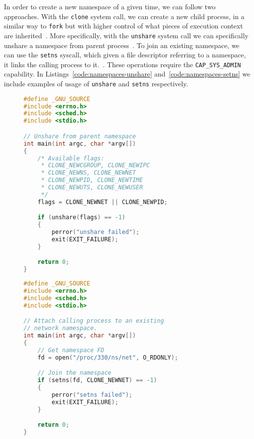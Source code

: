 In order to create a new namespace of a given time, we can follow two approaches.
With the \texttt{clone} system call, we can create a new child process, in a similar way to \texttt{fork} but with higher control of what pieces of execution context are inherited~\cite{clone-manual}.
More specifically, with the \texttt{unshare} system call we can specifically unshare a namespace from parent process~\cite{unshare-manual}.
To join an existing namespace, we can use the \texttt{setns} syscall, which given a file descriptor referring to a namespace, it links the calling process to it.~\cite{setns-manual}.
These operations require the \texttt{CAP\_SYS\_ADMIN} capability.
In Listings~\ref{code:namespaces-unshare} and~\ref{code:namespaces-setns} we include examples of usage of \texttt{unshare} and \texttt{setns} respectively.
\begin{figure}[h!]
    \begin{minipage}{.45\textwidth}
        \begin{lstlisting}[language=C,caption={Snippet to unshare the calling thread from a namespace using the \texttt{unshare} system call.\label{code:namespaces-unshare}}]
#define _GNU_SOURCE
#include <errno.h>
#include <sched.h>
#include <stdio.h>

// Unshare from parent namespace
int main(int argc, char *argv[])
{
    /* Available flags:
     * CLONE_NEWCGROUP, CLONE_NEWIPC
     * CLONE_NEWNS, CLONE_NEWNET
     * CLONE_NEWPID, CLONE_NEWTIME
     * CLONE_NEWUTS, CLONE_NEWUSER
     */
    flags = CLONE_NEWNET || CLONE_NEWPID;

    if (unshare(flags) == -1)
    {
        perror("unshare failed");
        exit(EXIT_FAILURE);        
    }

    return 0;
}
\end{lstlisting}
    \end{minipage} \hfill
    \begin{minipage}{.45\textwidth}
        \begin{lstlisting}[language=C,caption={Scripts to perfrom two pre-dumps and a dump of a running process using CRIU.\label{code:namespaces-setns}}]
#define _GNU_SOURCE
#include <errno.h>
#include <sched.h>
#include <stdio.h>

// Attach calling process to an existing
// network namespace.
int main(int argc, char *argv[])
{
    // Get namespace FD
    fd = open("/proc/330/ns/net", O_RDONLY);

    // Join the namespace
    if (setns(fd, CLONE_NEWNET) == -1)
    {
        perror("setns failed");
        exit(EXIT_FAILURE);        
    }

    return 0;
}
\end{lstlisting}
    \end{minipage}
\end{figure}

